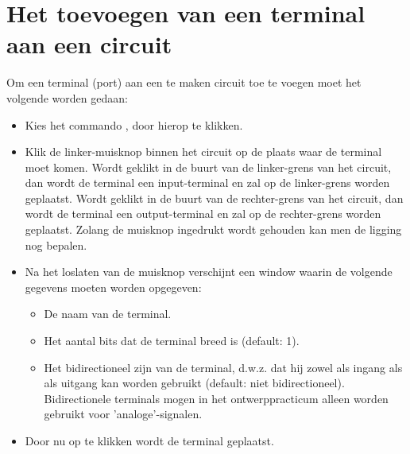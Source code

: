 \section{Het toevoegen van een terminal aan een circuit}
Om een terminal (port) aan een te maken circuit toe te voegen moet het volgende
worden gedaan:
\begin{itemize}
\item Kies het commando , door hierop te klikken.
\item Klik de linker-muisknop binnen het circuit op de plaats waar de terminal
      moet komen. Wordt geklikt in de buurt van de linker-grens van het circuit,
      dan wordt de terminal een input-terminal en zal op de linker-grens
      worden geplaatst. Wordt geklikt in de buurt van de rechter-grens van het
      circuit, dan wordt de terminal een output-terminal en zal op de
      rechter-grens worden geplaatst.
      Zolang de muisknop ingedrukt wordt gehouden kan men de ligging nog bepalen.
\item Na het loslaten van de muisknop verschijnt een window waarin de volgende gegevens moeten worden
      opgegeven:
      \begin{itemize}
      \item De naam van de terminal.
      \item Het aantal bits dat de terminal breed is (default: 1).
      \item Het bidirectioneel zijn van de terminal, d.w.z. dat hij zowel als
            ingang als als uitgang kan worden gebruikt (default: niet bidirectioneel).
            Bidirectionele terminals mogen in het ontwerppracticum alleen
            worden gebruikt voor 'analoge'-signalen.
      \end{itemize}
\item Door nu op  te klikken wordt de terminal geplaatst.
\end{itemize}

